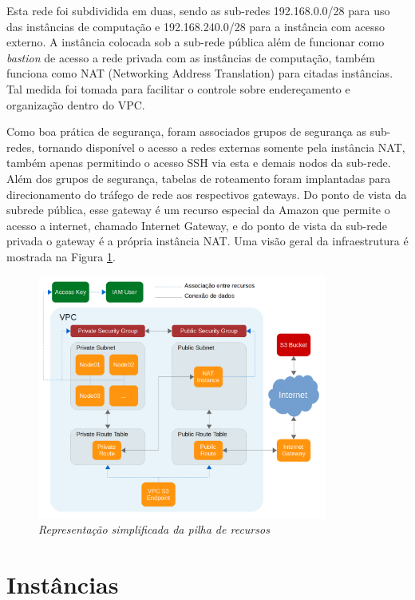 \documentclass[tg]{mdtufsm}
\begin{document}
Esta rede foi subdividida em duas, sendo as sub-redes 192.168.0.0/28 para uso das instâncias de computação e 192.168.240.0/28 para a instância com acesso externo. A instância colocada sob a sub-rede pública além de funcionar como \emph{bastion} de acesso a rede privada com as instâncias de computação, também funciona como NAT (Networking Address Translation) para citadas instâncias. Tal medida foi tomada para facilitar o controle sobre endereçamento e organização dentro do VPC.

Como boa prática de segurança, foram associados grupos de segurança as sub-redes, tornando disponível o acesso a redes externas somente pela instância NAT, também apenas permitindo o acesso SSH via esta e demais nodos da sub-rede. Além dos grupos de segurança, tabelas de roteamento foram implantadas para direcionamento do tráfego de rede aos respectivos gateways. Do ponto de vista da subrede pública, esse gateway é um recurso especial da Amazon que permite o acesso a internet, chamado Internet Gateway, e do ponto de vista da sub-rede privada o gateway é a própria instância NAT. Uma visão geral da infraestrutura é mostrada na Figura \ref{fig:myInfra}.

\begin{figure}
	\centering
	\includegraphics[width=0.85\textwidth]{simplified-infra}
	\caption{\emph{Representação simplificada da pilha de recursos}}
	\label{fig:myInfra}
\end{figure}

\section{Instâncias}
\end{document}
